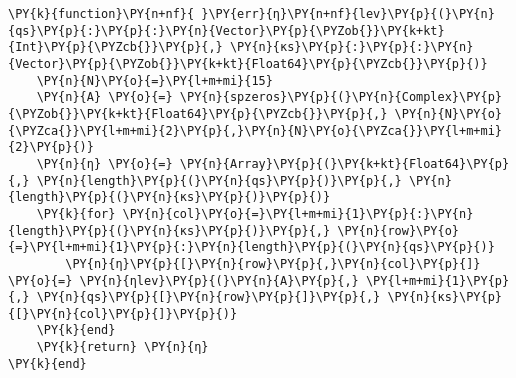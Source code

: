 \begin{Verbatim}[commandchars=\\\{\}]
\PY{k}{function}\PY{n+nf}{ }\PY{err}{η}\PY{n+nf}{lev}\PY{p}{(}\PY{n}{qs}\PY{p}{:}\PY{p}{:}\PY{n}{Vector}\PY{p}{\PYZob{}}\PY{k+kt}{Int}\PY{p}{\PYZcb{}}\PY{p}{,} \PY{n}{κs}\PY{p}{:}\PY{p}{:}\PY{n}{Vector}\PY{p}{\PYZob{}}\PY{k+kt}{Float64}\PY{p}{\PYZcb{}}\PY{p}{)}
    \PY{n}{N}\PY{o}{=}\PY{l+m+mi}{15}
    \PY{n}{A} \PY{o}{=} \PY{n}{spzeros}\PY{p}{(}\PY{n}{Complex}\PY{p}{\PYZob{}}\PY{k+kt}{Float64}\PY{p}{\PYZcb{}}\PY{p}{,} \PY{n}{N}\PY{o}{\PYZca{}}\PY{l+m+mi}{2}\PY{p}{,}\PY{n}{N}\PY{o}{\PYZca{}}\PY{l+m+mi}{2}\PY{p}{)}
    \PY{n}{η} \PY{o}{=} \PY{n}{Array}\PY{p}{(}\PY{k+kt}{Float64}\PY{p}{,} \PY{n}{length}\PY{p}{(}\PY{n}{qs}\PY{p}{)}\PY{p}{,} \PY{n}{length}\PY{p}{(}\PY{n}{κs}\PY{p}{)}\PY{p}{)}
    \PY{k}{for} \PY{n}{col}\PY{o}{=}\PY{l+m+mi}{1}\PY{p}{:}\PY{n}{length}\PY{p}{(}\PY{n}{κs}\PY{p}{)}\PY{p}{,} \PY{n}{row}\PY{o}{=}\PY{l+m+mi}{1}\PY{p}{:}\PY{n}{length}\PY{p}{(}\PY{n}{qs}\PY{p}{)}
        \PY{n}{η}\PY{p}{[}\PY{n}{row}\PY{p}{,}\PY{n}{col}\PY{p}{]} \PY{o}{=} \PY{n}{ηlev}\PY{p}{(}\PY{n}{A}\PY{p}{,} \PY{l+m+mi}{1}\PY{p}{,} \PY{n}{qs}\PY{p}{[}\PY{n}{row}\PY{p}{]}\PY{p}{,} \PY{n}{κs}\PY{p}{[}\PY{n}{col}\PY{p}{]}\PY{p}{)}
    \PY{k}{end}
    \PY{k}{return} \PY{n}{η}
\PY{k}{end}


\end{Verbatim}
